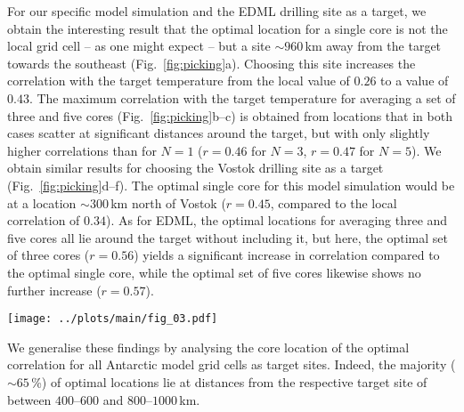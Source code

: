 \documentclass[cp, manuscript, draft]{copernicus}
\begin{document}
For our specific model simulation and the EDML drilling site as a target, we
obtain the interesting result that the optimal location for a single core is not
the local grid cell -- as one might expect -- but a site $\sim960$\,km away from
the target towards the southeast (Fig.~\ref{fig:picking}a). Choosing this site
increases the correlation with the target temperature from the local value of
$0.26$ to a value of $0.43$. The maximum correlation with the target temperature
for averaging a set of three and five cores (Fig.~\ref{fig:picking}b--c) is
obtained from locations that in both cases scatter at significant distances
around the target, but with only slightly higher correlations than for $N=1$
($r=0.46$ for $N=3$, $r=0.47$ for $N=5$). We obtain similar results for
choosing the Vostok drilling site as a target (Fig.~\ref{fig:picking}d--f). The
optimal single core for this model simulation would be at a location
$\sim300$\,km north of Vostok ($r=0.45$, compared to the local correlation of
$0.34$). As for EDML, the optimal locations for averaging three and five cores
all lie around the target without including it, but here, the optimal set of
three cores ($r=0.56$) yields a significant increase in correlation compared to
the optimal single core, while the optimal set of five cores likewise shows no
further increase ($r=0.57$).

\begin{figure*}[t]%
\centering
\texttt{[image: ../plots/main/fig\_03.pdf]}
\caption[Picking optimal sites]{%
  Picking ice core locations that optimally reconstruct interannual temperatures
  at the EDML and Vostok drilling sites. The maps show the correlation in the
  model data between the annual temperature time series at the target sites
  (black crosses) EDML (\textbf{a}--\textbf{c}) and Vostok
  (\textbf{d}--\textbf{f}) with the fields of precipitation-weighted oxygen
  isotope composition. Filled black circles denote those grid cells that
  maximise the correlation with the target site temperature for choosing either
  a single grid cell ($N=1$; \textbf{a}, \textbf{d}) or for averaging across
  $N=3$ (\textbf{b}, \textbf{e}) or $N=5$ (\textbf{c}, \textbf{f}) grid cells.}
\label{fig:picking}%
\end{figure*}%

We generalise these findings by analysing the core location of the optimal
correlation for all Antarctic model grid cells as target sites. Indeed, the
majority ($\sim65$\,\%) of optimal locations lie at distances from the
respective target site of between $400$--$600$ and $800$--$1000$\,km.
\end{document}
